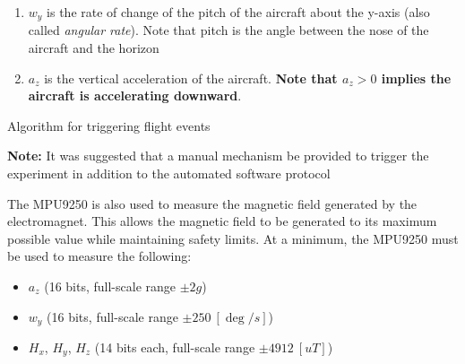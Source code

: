 \documentclass{article}
\begin{document}
\begin{enumerate}
	\item $w_y$ is the rate of change of the pitch of the aircraft about the y-axis (also called \textit{angular rate}). Note that pitch is the angle between the nose of the aircraft and the horizon %
	
	\item $a_z$ is the vertical acceleration of the aircraft. \textbf{Note that $a_z > 0$ implies the aircraft is accelerating downward}.
\end{enumerate}

\begin{algorithm}
	\caption{Algorithm for triggering flight events}
	\begin{algorithmic}[1]
				\State {}
				
				\State {}
				
				\State {}
				
			\Else
				\State {}
				
			\EndIf
		\EndProcedure
	\end{algorithmic}
\end{algorithm}

\textbf{Note:} It was suggested that a manual mechanism be provided to trigger the experiment in addition to the automated software protocol
\newline
\newline

The MPU9250 is also used to measure the magnetic field generated by the electromagnet. This allows the magnetic field to be generated to its maximum possible value while maintaining safety limits.
\newline
\newline
At a minimum, the MPU9250 must be used to measure the following:
\begin{itemize}
	\item $a_z$ (16 bits, full-scale range $\pm 2g$)
	\item $w_y$ (16 bits, full-scale range $\pm 250 \ [\deg/s]$)
	\item $H_x$, $H_y$, $H_z$ (14 bits each, full-scale range $\pm 4912 \ [uT]$)
\end{itemize}
\end{document}
